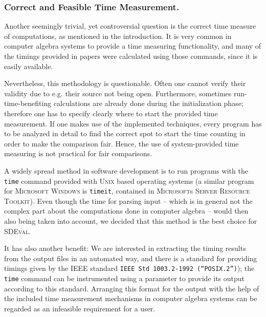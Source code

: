 \documentclass[oribibl,11pt]{article}
\begin{document}
\subsubsection{Correct and Feasible Time Measurement.} Another seemingly trivial, yet controversial question is the correct
time measure of computations, as mentioned in the introduction. It is
very common in computer algebra systems to provide a time measuring
functionality, and many of the timings provided in papers were
calculated using those commands, since it is easily available.

Nevertheless, this methodology is questionable. Often one cannot
verify their validity due to e.g. their source not being
open. Furthermore, sometimes run-time-benefiting calculations are
already done during the initialization phase; therefore one has to
specify clearly where to start the provided time measurement. If one
makes use of the implemented techniques, every program has to be
analyzed in detail to find the correct spot to start the time counting
in order to make the comparison fair. Hence, the use of
system-provided time measuring is not practical for fair
comparisons. %

A widely spread method in software development is to run programs with
the \texttt{time} command provided with \textsc{Unix} based operating
systems (a similar program for \textsc{Microsoft  Windows} is
 \texttt{timeit}, contained in \textsc{Microsoft}s \textsc{Server
  Resource Toolkit}). Even though the time for parsing input --
which is in general not the complex part about the computations done
in computer algebra -- would then also being taken into account, we
decided that this method is the best choice for \textsc{SDEval}.

It has also another benefit: We are interested in extracting the
timing results from the output files in an automated way, and there is
a standard for providing timings given by the \textsc{IEEE} standard
\texttt{IEEE Std 1003.2-1992 (``POSIX.2'')}); the \texttt{time}
command can be instrumented using a parameter to provide its output
according to this standard. Arranging this format for the output with
the help of the included time measurement mechanisms in computer
algebra systems can be regarded as an infeasible requirement for a
user.%
\end{document}
